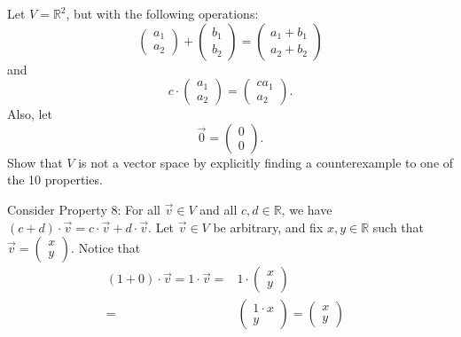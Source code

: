 \documentclass[12pt]{article}
\newenvironment{problem}[2][Problem]
{
	\begin{trivlist} 
		\item[\hskip \labelsep {\bfseries #1 #2:}]
	}
{
	\end{trivlist}
	}
\newenvironment{solution}[1][Solution]
{
	\begin{trivlist} 
		\item[\hskip \labelsep {\itshape #1:}]
	}
	{
	\end{trivlist}
}
\begin{document}
\begin{problem}{1}
\begin{solution}
\end{solution}
\end{problem}






\newpage
\begin{problem}{2}
Let $V=\mathbb{R}^2$, but with the following operations:
\[
\begin{pmatrix} a_1\\a_2\end{pmatrix} + \begin{pmatrix} b_1\\b_2\end{pmatrix} = \begin{pmatrix} a_1 +b_1\\a_2 + b_2\end{pmatrix}
\]
and
\[
c\cdot \begin{pmatrix}a_1\\a_2\end{pmatrix} = \begin{pmatrix}ca_1\\a_2\end{pmatrix} \text{.}
\]
Also, let 
\[
\vec{0}=\begin{pmatrix}0\\0\end{pmatrix} \text{.}
\]
Show that $V$ is not a vector space by explicitly finding a counterexample to one of the 10 properties.
\noindent
\newline
\newline
\begin{solution}
Consider Property 8:
\newline
\newline
\noindent
For all $\vec{v} \in V$ and all $c,d\in \mathbb{R}$, we have $(c+d)\cdot \vec{v} = c\cdot \vec{v} + d\cdot \vec{v}$. Let $\vec{v} \in V$ be arbitrary, and fix $x,y \in \mathbb{R}$ such that $\vec{v} = \begin{pmatrix}x\\y\end{pmatrix}$. Notice that
\begin{align*}
(1+0) \cdot \vec{v} = 1 \cdot \vec{v} =& 1\cdot \begin{pmatrix}x\\y\end{pmatrix} &\\
=&  \begin{pmatrix}1\cdot x\\y\end{pmatrix} =  \begin{pmatrix}x\\y\end{pmatrix} &

\end{align*}
\end{solution}
\end{problem}
\end{document}
